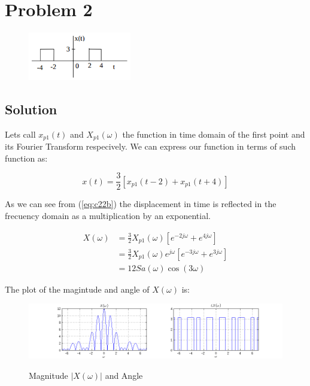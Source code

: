 \section*{Problem 2}

\begin{figure}[H]
\caption*{}
\centering
\includegraphics[width=0.4\textwidth]{figs/c2p2.png}
\label{fig:c2p2}
\end{figure} 

\subsection*{Solution}

Lets call $x_{p1}(t)$ and $X_{p1}(\omega)$ the function in time domain of the first point 
and its Fourier Transform respecively. 
We can express our function in terms of such function as:

\begin{equation*}
x(t) = \frac{3}{2} [x_{p1}(t-2) + x_{p1}(t+4)]
\end{equation*} 

As we can see from (\ref{eq:c22b}) the displacement in time is reflected in the
frecuency domain as a multiplication by an exponential. 

\begin{equation*}
\begin{aligned}
X(\omega) &= \frac{3}{2} X_{p1}(\omega) [ e^{- 2 j \omega} + e^{4 j \omega} ] \\
&= \frac{3}{2} X_{p1}(\omega) e^{j \omega} [ e^{- 3 j \omega} + e^{3 j \omega} ] \\
&= 12 Sa(\omega) \cos(3 \omega)
\end{aligned}
\end{equation*} 

The plot of the magintude and angle of $X(\omega)$ is:

\begin{figure}[H]
\caption{Magnitude $|X(\omega)|$ and Angle}
\centering
\includegraphics[width=1.0\textwidth]{figs/c2p2a.png}
\label{fig:c2p2a}
\end{figure} 

